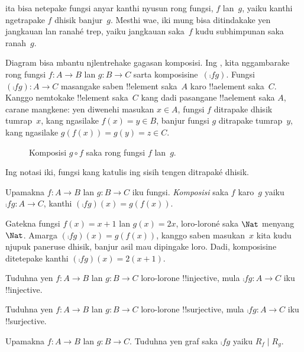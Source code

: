 \documentclass[../../../include/open-logic-section]{subfiles}
\begin{document}

\begin{explain}
ita bisa netepake fungsi
anyar kanthi nyusun rong fungsi, $f$ lan~$g$, yaiku kanthi ngetrapake
$f$ dhisik banjur~$g$. Mesthi wae, iki mung bisa ditindakake yen
jangkauan lan ranahé trep, yaiku jangkauan saka~$f$ kudu subhimpunan
saka ranah~$g$. 

Diagram bisa mbantu njlentrehake gagasan komposisi. Ing
, kita nggambarake rong fungsi $f \colon A \to B$
lan $g \colon B \to C$ sarta komposisine~$(\comp{f}{g})$. Fungsi
$(\comp{f}{g}) \colon A \to C$ masangake saben !!{element} saka~$A$
karo !!a{element} saka~$C$. Kanggo nemtokake !!{element} saka~$C$
kang dadi pasangane !!a{element} saka $A$, carane mangkene: yen diwenehi masukan $x \in
A$, fungsi $f$ ditrapake dhisik tumrap~$x$, kang ngasilake $f(x)
= y \in B$, banjur fungsi $g$ ditrapake tumrap~$y$, kang ngasilake
$g(f(x)) = g(y) = z \in C$.
\begin{figure}
  \caption{Komposisi $g \circ f$ saka rong fungsi $f$ lan~$g$.}
\end{figure}
Ing notasi iki, fungsi kang katulis ing sisih tengen ditrapaké dhisik.
\end{explain}

\begin{defn}[Komposisi]
Upamakna $f\colon A \to B$ lan $g\colon B \to C$ iku fungsi.
\emph{Komposisi} saka $f$ karo~$g$ yaiku $\comp{f}{g} \colon A \to C$,
kanthi $(\comp{f}{g})(x) = g(f(x))$.
\end{defn}

\begin{ex}
Gatekna fungsi $f(x) = x + 1$ lan $g(x) = 2x$, loro-loroné saka $\Nat$ menyang $\Nat$. Amarga
$(\comp{f}{g})(x) = g(f(x))$, kanggo saben masukan~$x$ kita kudu njupuk
paneruse dhisik, banjur asil mau dipingake loro. Dadi, komposisine
ditetepake kanthi $(\comp{f}{g})(x) = 2(x+1)$.
\end{ex}

\begin{prob}
Tuduhna yen $f \colon A \to B$ lan $g \colon B \to C$ loro-lorone
!!{injective}, mula $\comp{f}{g}\colon A \to C$ iku !!{injective}.
\end{prob}

\begin{prob}
Tuduhna yen $f \colon A \to B$ lan $g \colon B \to C$ loro-lorone
!!{surjective}, mula $\comp{f}{g}\colon A \to C$ iku !!{surjective}.
\end{prob}

\begin{prob}
Upamakna $f \colon A \to B$ lan $g \colon B \to C$. Tuduhna yen graf
saka $\comp{f}{g}$ yaiku $R_f \mid R_g$.
\end{prob}
\end{document}
